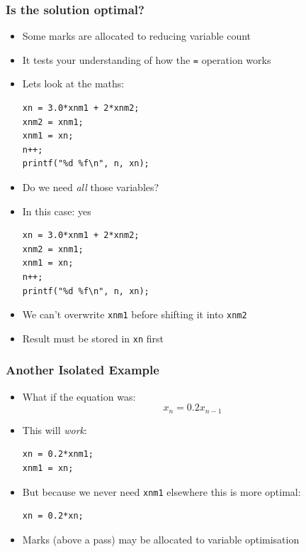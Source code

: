 \documentclass[14pt]{beamer}
\begin{document}
\begin{frame}[fragile]
\frametitle{Is the solution optimal?}
\begin{itemize}
\item Some marks are allocated to reducing variable count
\item It tests your understanding of how the \texttt{=} operation works
\item Lets look at the maths:
\begin{lstlisting}[style=CStyle]
xn = 3.0*xnm1 + 2*xnm2;
xnm2 = xnm1;
xnm1 = xn;
n++;
printf("%d %f\n", n, xn);
\end{lstlisting}
\item Do we need \textit{all} those variables?
\end{itemize}
\end{frame}

\begin{frame}[fragile]
\begin{itemize}
\item In this case: yes
\begin{lstlisting}[style=CStyle]
xn = 3.0*xnm1 + 2*xnm2;
xnm2 = xnm1;
xnm1 = xn;
n++;
printf("%d %f\n", n, xn);
\end{lstlisting}
\item We can't overwrite \texttt{xnm1} before shifting it into \texttt{xnm2}
\item Result must be stored in \texttt{xn} first
\end{itemize}
\end{frame}

\begin{frame}[fragile]
\frametitle{Another Isolated Example}
\begin{itemize}
\item What if the equation was:
\begin{equation*}
x_n = 0.2x_{n-1}
\end{equation*}
\item This will \textit{work}:

\begin{lstlisting}[style=CStyle]
xn = 0.2*xnm1;
xnm1 = xn;
\end{lstlisting}

\item But because we never need \texttt{xnm1} elsewhere this is more optimal:
\begin{lstlisting}[style=CStyle]
xn = 0.2*xn;
\end{lstlisting}
\item Marks (above a pass) may be allocated to variable optimisation
\end{itemize}
\end{frame}
\end{document}
